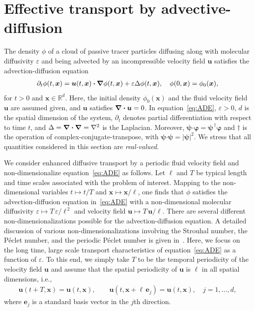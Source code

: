 \documentclass[leqno,onefignum,onetabnum]{siamltex1213}
\newcommand\bnabla{\mbox{\boldmath${\nabla}$}}
\providecommand\bcdot{\boldsymbol{\cdot}}
\newcommand{\vecx}{\boldsymbol{x}}
\newcommand{\vecu}{\boldsymbol{u}}
\newcommand{\vece}{\boldsymbol{e}}
\newcommand{\vecpsi}{\boldsymbol{\psi}}
\newcommand{\vecvarphi}{\boldsymbol{\varphi}}
\begin{document}
\section{Effective transport by
  advective-diffusion} \label{sec:Eff_Trans}    
%
The density $\phi$ of a cloud of passive tracer particles diffusing along
with molecular diffusivity $\varepsilon$ and being advected by an incompressible
velocity field $\vecu$ satisfies the advection-diffusion equation
%
\begin{align}\label{eq:ADE}
  \partial_t\phi(t,\vecx)
    =\vecu (t,\vecx)\bcdot\bnabla \phi(t,\vecx)+\varepsilon\Delta \phi(t,\vecx),
  \quad
  \phi(0,\vecx)=\phi_0(\vecx),  
\end{align}
%
for $t>0$ and $\vecx\in\mathbb{R}^d$.
Here, the initial density $\phi_0(\vecx)$ and the fluid velocity field
$\vecu$ are assumed given, and $\vecu$ satisfies $\bnabla\bcdot\vecu=0$.
In equation~\eqref{eq:ADE}, $\varepsilon>0$, $d$ is the spatial dimension of the
system, $\partial_t$ denotes partial differentiation with respect to time
$t$, and $\Delta=\bnabla\bcdot\bnabla =\nabla^2$ is the Laplacian. Moreover, 
$\vecpsi\bcdot\vecvarphi=\vecpsi^{\,\dagger}\vecvarphi$ and $\dagger$ is the
operation of complex-conjugate-transpose, with
$\vecpsi\bcdot\vecpsi=|\vecpsi|^2$. We stress that all quantities 
considered in this section are \emph{real-valued}. 




We consider enhanced diffusive transport by a periodic fluid velocity
field and non-dimensionalize equation~\eqref{eq:ADE} as follows. Let
$\ell$ and $T$ be typical length and time scales associated with the
problem of interest. Mapping to the non-dimensional variables
$t\mapsto t/T$ and $\vecx\mapsto \vecx/\ell$,
one finds that $\phi$ satisfies the advection-diffusion equation
in~\eqref{eq:ADE} with a non-dimensional molecular diffusivity 
$\varepsilon\mapsto T\,\varepsilon/\ell^{\,2}$ and velocity field $\vecu\mapsto T\,\vecu /\ell$. There are
several different non-dimensionalizations possible 
for the advection-diffusion equation. A detailed discussion of 
various non-dimensionalizations involving the Strouhal number, the
P\'{e}clet number, and the periodic P\'{e}clet number is given
in~\cite{McLaughlin:Forest:PF:1999:880,Majda:Kramer:1999:book}.  Here,
we focus on the long time, large scale transport characteristics of
equation~\eqref{eq:ADE} as a function of $\varepsilon$. To this end, we simply
take $T$ to be the temporal periodicity of the velocity field $\vecu$
and assume that the spatial periodicity of $\vecu$ is $\ell$ in all
spatial dimensions, i.e., 
%
\begin{align}\label{eq:Periodic_u}
  \vecu(t+T,\vecx)=\vecu(t,\vecx), \qquad
  \vecu(t,\vecx+\ell\,\vece_j)=\vecu(t,\vecx), \quad
  j=1,\ldots,d,
\end{align}
%
where $\vece_j$ is a standard basis vector in the $j$th direction. 
\end{document}
